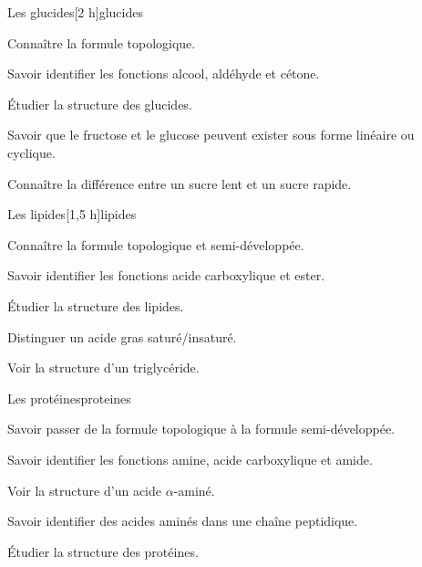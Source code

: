 \begin{multicols}{2}
  \begin{TP}{Les glucides}[2 h]{glucides}
    \begin{prerequis}
      \item Connaître la formule topologique.
      \item Savoir identifier les fonctions alcool, aldéhyde et cétone.
    \end{prerequis}
    \begin{objectifs}  
      \item Étudier la structure des glucides.
      \item Savoir que le fructose et le glucose peuvent exister sous forme linéaire ou cyclique.
      \item Connaître la différence entre un sucre lent et un sucre rapide.
    \end{objectifs}
  \end{TP}

  \begin{activite}{Les lipides}[1,5 h]{lipides}
    \begin{prerequis}
      \item Connaître la formule topologique et semi-développée.
      \item Savoir identifier les fonctions acide carboxylique et ester.
    \end{prerequis}
    \begin{objectifs}
      \item Étudier la structure des lipides.
      \item Distinguer un acide gras saturé/insaturé.
      \item Voir la structure d'un triglycéride.
    \end{objectifs}
  \end{activite}

  \begin{activite}{Les protéines}{proteines}
    \begin{prerequis}
      \item Savoir passer de la formule topologique à la formule semi-développée.
      \item Savoir identifier les fonctions amine, acide carboxylique et amide.
    \end{prerequis}
    \begin{objectifs}
      \item Voir la structure d'un acide $\alpha$-aminé.
      \item Savoir identifier des acides aminés dans une chaîne peptidique.
      \item Étudier la structure des protéines.
    \end{objectifs}
  \end{activite}


\end{multicols}
